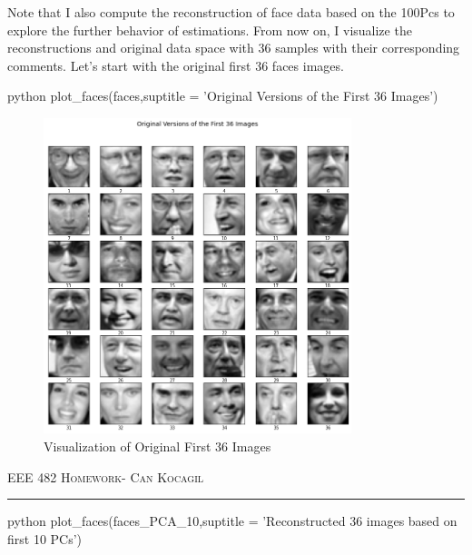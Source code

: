 \documentclass[12pt]{amsart}
\begin{document}
Note that I also compute the reconstruction of face data based on the 100Pcs to explore the further behavior of estimations. From now on, I visualize the reconstructions and original data space with 36 samples with their corresponding comments. Let's start with the original first 36 faces images.

\begin{mintedbox}{python}
plot_faces(faces,suptitle = 'Original Versions of the First 36 Images')
\end{mintedbox}

\begin{figure}[h]
    \centering
        \includegraphics[width = 0.8\textwidth]{images/Q1/Original_face_images_36.png}
        \caption{Visualization of Original First 36 Images}
\end{figure}


\newpage
{\scshape EEE 482} \hfill {\scshape \large  Homework-\relax} \hfill {\scshape Can Kocagil}
\smallskip
\hrule
\vspace{2mm}

\begin{mintedbox}{python}
plot_faces(faces_PCA_10,suptitle = 'Reconstructed 36 images based on first 10 PCs')
\end{mintedbox}
\end{document}
